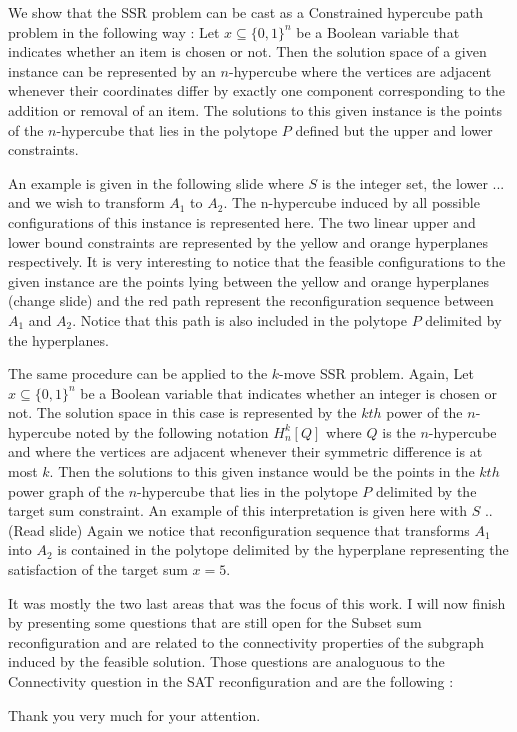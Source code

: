 We show that the SSR problem can be cast as a Constrained hypercube path problem in the following way : 
Let $x \subseteq \{0,1\}^{n}$ be a Boolean variable that indicates whether an item is chosen or not.  
Then the solution space of a given instance can be represented by an $n$-hypercube where the vertices are adjacent whenever their coordinates differ by exactly one component corresponding to the addition or removal of an item. 
The solutions to this given instance is the points of the $n$-hypercube that lies in the polytope $P$ defined but the upper and lower constraints. 

An example is given in the following slide where $S$ is the integer set, the lower ... and we wish to transform $A_1$ to $A_2$.  The n-hypercube induced by all possible conﬁgurations of this instance is represented here.  The two linear upper and lower bound constraints are represented by the yellow and orange hyperplanes respectively. It is very interesting to notice that the feasible conﬁgurations to the given instance are the points lying between the yellow and orange hyperplanes (change slide) and the red path represent the reconﬁguration sequence between $A_1$ and $A_2$. Notice that this path is also included in the polytope $P$ delimited by the hyperplanes.

The same procedure can be applied to the $k$-move SSR problem.
Again,  Let $x \subseteq \{0,1\}^{n}$ be a Boolean variable that indicates whether an integer is chosen or not. The solution space in this case is represented by the $kth$ power of the $n$-hypercube noted by the following notation $H_n^k[Q]$ where $Q$ is the $n$-hypercube and where the vertices are adjacent whenever their symmetric difference is at most $k$.
Then the solutions to this given instance would be the points in the $kth$ power graph of the $n$-hypercube that lies in the polytope $P$ delimited by the target sum constraint. 
An example of this interpretation is given here with $S$ ..
(Read slide)
Again we notice that reconfiguration sequence that transforms $A_1$ into $A_2$ is contained in the polytope delimited by the hyperplane representing the satisfaction of the target sum $x = 5$. 

It was mostly the two last areas that was the focus of this work. I will now finish by presenting some questions that are still open for the Subset sum reconfiguration and are related to the connectivity properties of the subgraph induced by the feasible solution. Those questions are analoguous to the Connectivity question in the SAT reconfiguration and are the following : 


Thank you very much for your attention. 


